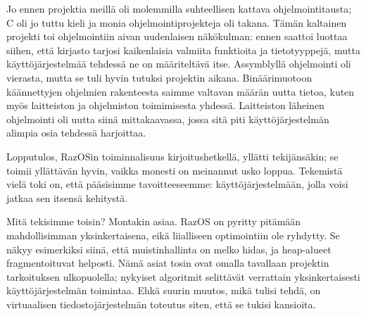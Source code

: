 Jo ennen projektia meillä oli molemmilla suhteellisen kattava ohjelmointitausta; C oli jo tuttu kieli ja monia ohjelmointiprojekteja oli takana. Tämän kaltainen projekti toi ohjelmointiin aivan uudenlaisen näkökulman: ennen saattoi luottaa siihen, että kirjasto tarjosi kaikenlaisia valmiita funktioita ja tietotyyppejä, mutta käyttöjärjestelmää tehdessä ne on määriteltävä itse. Assymblyllä ohjelmointi oli vierasta, mutta se tuli hyvin tutuksi projektin aikana. Binäärimuotoon käännettyjen ohjelmien rakenteesta saimme valtavan määrän uutta tietoa, kuten myös laitteiston ja ohjelmiston toimimisesta yhdessä. Laitteiston läheinen ohjelmointi oli uutta siinä mittakaavassa, jossa sitä piti käyttöjärjestelmän alimpia osia tehdessä harjoittaa.

\par

Lopputulos, RazOSin toiminnalisuus kirjoitushetkellä, yllätti tekijänsäkin; se toimii yllättävän hyvin, vaikka monesti on meinannut usko loppua. Tekemistä vielä toki on, että pääsisimme tavoitteeseemme: käyttöjärjestelmään, jolla voisi jatkaa sen itsensä kehitystä.

\par

Mitä tekisimme toisin? Montakin asiaa. RazOS on pyritty pitämään mahdollisimman yksinkertaisena, eikä liialliseen optimointiin ole ryhdytty. Se näkyy esimerkiksi siinä, että muistinhallinta on melko hidas, ja heap-alueet fragmentoituvat helposti. Nämä asiat tosin ovat omalla tavallaan projektin tarkoituksen ulkopuolella; nykyiset algoritmit selittävät verrattain yksinkertaisesti käyttöjärjestelmän toimintaa. Ehkä suurin muutos, mikä tulisi tehdä, on virtuaalisen tiedostojärjestelmän toteutus siten, että se tukisi kansioita.